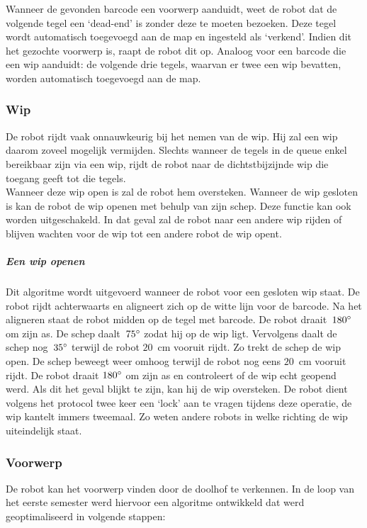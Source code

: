 \documentclass[eind]{penoverslag}
\begin{document}

Wanneer de gevonden barcode een voorwerp aanduidt, weet de robot dat de volgende tegel een `dead-end' is zonder deze te moeten bezoeken. Deze tegel wordt automatisch toegevoegd aan de map en ingesteld als `verkend'. Indien dit het gezochte voorwerp is, raapt de robot dit op.
Analoog voor een barcode die een wip aanduidt: de volgende drie tegels, waarvan er twee een wip bevatten, worden automatisch toegevoegd aan de map.


\subsubsection{Wip}
\label{sssec:AlgoWip}
De robot rijdt vaak onnauwkeurig bij het nemen van de wip. Hij zal een wip daarom zoveel mogelijk vermijden. Slechts wanneer de tegels in de queue enkel bereikbaar zijn via een wip, rijdt de robot naar de dichtstbijzijnde wip die toegang geeft tot die tegels.\\

Wanneer deze wip open is zal de robot hem oversteken. Wanneer de wip gesloten is kan de robot de wip openen met behulp van zijn schep. Deze functie kan ook worden uitgeschakeld. In dat geval zal de robot naar een andere wip rijden of blijven wachten voor de wip tot een andere robot de wip opent.

\subparagraph{Een wip openen} 
Dit algoritme wordt uitgevoerd wanneer de robot voor een gesloten wip staat. De robot rijdt achterwaarts en aligneert zich op de witte lijn voor de barcode. Na het aligneren staat de robot midden op de tegel met barcode. De robot draait~$180\degree$ om zijn as. De schep daalt~$75\degree$ zodat hij op de wip ligt. Vervolgens daalt de schep nog~$35\degree$ terwijl de robot $20$~cm vooruit rijdt. Zo trekt de schep de wip open. De schep beweegt weer omhoog terwijl de robot nog eens $20$~cm vooruit rijdt. De robot draait $180\degree$ om zijn as en controleert of de wip echt geopend werd. Als dit het geval blijkt te zijn, kan hij de wip oversteken. De robot dient volgens het protocol twee keer een `lock' aan te vragen tijdens deze operatie, de wip kantelt immers tweemaal. Zo weten andere robots in welke richting de wip uiteindelijk staat.

\subsubsection{Voorwerp} %
\label{sssec:AlgoZoek}
De robot kan het voorwerp vinden door de doolhof te verkennen. In de loop van het eerste semester werd hiervoor een algoritme ontwikkeld dat werd geoptimaliseerd in volgende stappen: 
\end{document}
